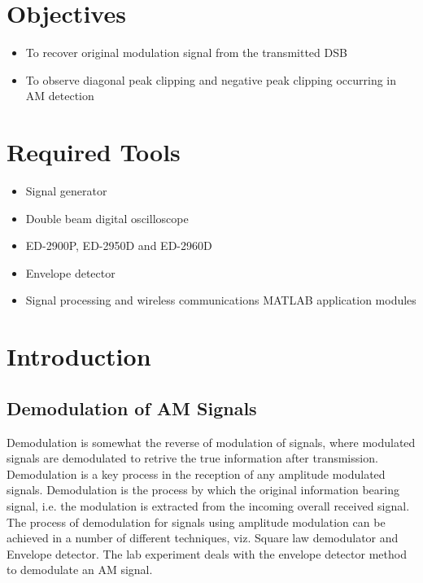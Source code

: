 \documentclass{lab_sheet}
\begin{document}
    \tableofcontents
    \pagebreak
    \section{Objectives}
    \begin{itemize}
        \item To recover original modulation signal from the transmitted DSB
        \item To observe diagonal peak clipping and negative peak clipping occurring in AM detection
     \end{itemize}
    \section{Required Tools}
    \begin{itemize}
        \item Signal generator
        \item Double beam digital oscilloscope
        \item ED-2900P, ED-2950D and ED-2960D
        \item Envelope detector
        \item Signal processing and wireless communications MATLAB application modules
    \end{itemize}
\section{Introduction}
\subsection{Demodulation of AM Signals}
Demodulation is somewhat the reverse of modulation of signals, where modulated signals are demodulated to retrive the true information after transmission. Demodulation is a key process in the reception of any amplitude modulated signals. Demodulation is the process by which the original information bearing signal, i.e. the modulation is extracted from the incoming overall received signal. The process of demodulation for signals using amplitude modulation can be achieved in a number of different techniques, viz. Square law demodulator and Envelope detector. The lab experiment deals with the envelope detector method to demodulate an AM signal.
\end{document}
